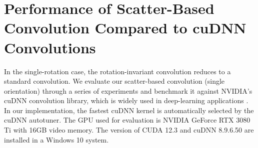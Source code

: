 \section{Performance of Scatter-Based Convolution Compared to cuDNN Convolutions} \label{appendix:compareCUDNN}

In the single-rotation case, the rotation-invariant convolution reduces to a standard convolution. We evaluate our scatter-based convolution (single orientation) through a series of experiments and benchmark it against NVIDIA’s cuDNN convolution library, which is widely used in deep-learning applications \cite{cuDNNsdk}. In our implementation, the fastest cuDNN kernel is automatically selected by the cuDNN autotuner.
The GPU used for evaluation is NVIDIA GeForce RTX 3080 Ti with 16GB video memory. The version of CUDA 12.3 and cuDNN 8.9.6.50 are installed in a Windows 10 system. 

